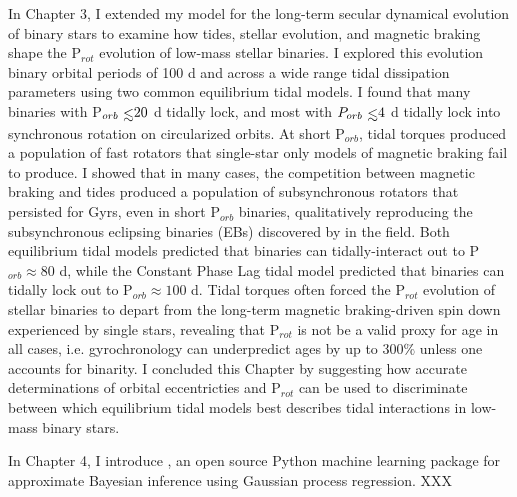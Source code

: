 In Chapter 3, I extended my model for the long-term secular dynamical evolution of binary stars to examine how tides, stellar evolution, and magnetic braking shape the P$_{rot}$ evolution of low-mass stellar binaries. I explored this evolution binary orbital periods of 100 d and across a wide range tidal dissipation parameters using two common equilibrium tidal models. I found that many binaries with P$_{orb} \lsim 20$ d tidally lock, and most with $P_{orb} \lsim 4$ d tidally lock into synchronous rotation on circularized orbits. At short P$_{orb}$, tidal torques produced a population of fast rotators that single-star only models of magnetic braking fail to produce.  I showed that in many cases, the competition between magnetic braking and tides produced a population of subsynchronous rotators that persisted for Gyrs, even in short P$_{orb}$ binaries, qualitatively reproducing the subsynchronous eclipsing binaries (EBs) discovered by \citet{Lurie2017} in the \kepler field. Both equilibrium tidal models predicted that binaries can tidally-interact out to P$_{orb} \approx 80$ d, while the Constant Phase Lag tidal model predicted that binaries can tidally lock out to P$_{orb} \approx 100$ d. Tidal torques often forced the P$_{rot}$ evolution of stellar binaries to depart from the long-term magnetic braking-driven spin down experienced by single stars, revealing that P$_{rot}$ is not be a valid proxy for age in all cases, i.e. gyrochronology can underpredict ages by up to $300\%$ unless one accounts for binarity. I concluded this Chapter by suggesting how accurate determinations of orbital eccentricties and P$_{rot}$ can be used to discriminate between which equilibrium tidal models best describes tidal interactions in low-mass binary stars.
 
In Chapter 4, I introduce \approxposterior, an open source Python machine learning package for approximate Bayesian inference using Gaussian process regression. XXX
 
